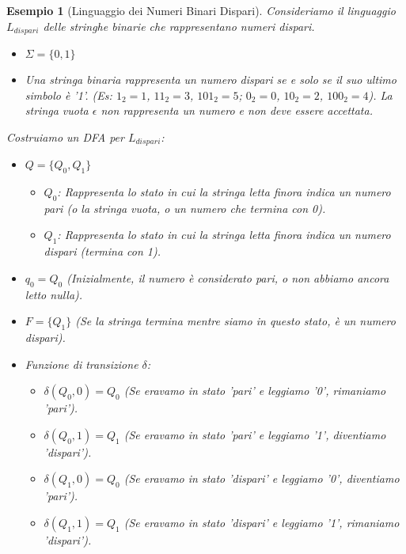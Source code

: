 \documentclass[a4paper, 11pt]{book} %
\newtheorem{example}[theorem]{Esempio}
\theoremstyle{definition}
\begin{document}
\begin{example}[Linguaggio dei Numeri Binari Dispari]
Consideriamo il linguaggio $L_{dispari}$ delle stringhe binarie che rappresentano numeri dispari.
\begin{itemize}
    \item $\Sigma = \{0, 1\}$
    \item Una stringa binaria rappresenta un numero dispari se e solo se il suo ultimo simbolo è '1'. (Es: $1_2=1$, $11_2=3$, $101_2=5$; $0_2=0$, $10_2=2$, $100_2=4$). La stringa vuota $\epsilon$ non rappresenta un numero e non deve essere accettata.
\end{itemize}

Costruiamo un DFA per $L_{dispari}$:
\begin{itemize}
    \item $Q = \{Q_0, Q_1\}$
        \begin{itemize}
            \item $Q_0$: Rappresenta lo stato in cui la stringa letta finora indica un numero pari (o la stringa vuota, o un numero che termina con 0).
            \item $Q_1$: Rappresenta lo stato in cui la stringa letta finora indica un numero dispari (termina con 1).
        \end{itemize}
    \item $q_0 = Q_0$ (Inizialmente, il numero è considerato pari, o non abbiamo ancora letto nulla).
    \item $F = \{Q_1\}$ (Se la stringa termina mentre siamo in questo stato, è un numero dispari).
    \item Funzione di transizione $\delta$:
        \begin{itemize}
            \item $\delta(Q_0, 0) = Q_0$ (Se eravamo in stato 'pari' e leggiamo '0', rimaniamo 'pari').
            \item $\delta(Q_0, 1) = Q_1$ (Se eravamo in stato 'pari' e leggiamo '1', diventiamo 'dispari').
            \item $\delta(Q_1, 0) = Q_0$ (Se eravamo in stato 'dispari' e leggiamo '0', diventiamo 'pari').
            \item $\delta(Q_1, 1) = Q_1$ (Se eravamo in stato 'dispari' e leggiamo '1', rimaniamo 'dispari').
        \end{itemize}
\end{itemize}

\begin{figure}[h!]
    \centering
\end{figure}
\end{example}
\end{document}
